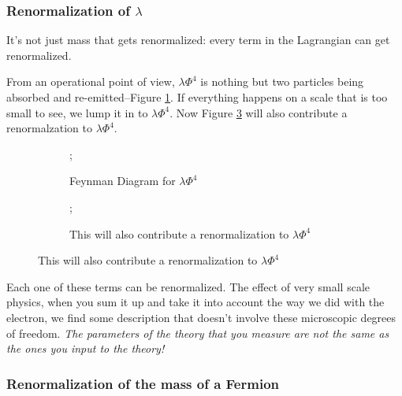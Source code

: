 \documentclass[]{article}
\begin{document}
\subsubsection{Renormalization of $\lambda$}\label{sect:renormalization:lambda}

It's not just mass that gets renormalized: every term in the Lagrangian can get renormalized.

From an operational point of view, $\lambda \Phi^4$ is nothing but two particles being absorbed and re-emitted--Figure \ref{fig:lambda:phi:4}. If everything happens on a scale that is too small to see, we lump it in to $\lambda \Phi^4$. Now Figure \ref{fig:lambda:phi:4x} will also contribute a renormalzation to $\lambda \Phi^4$.

\begin{figure}[H]
	\begin{center}
		\caption{Renormalization of $\lambda \Phi^4$}
		\begin{subfigure}[t]{0.45\textwidth}
			\begin{center}
				\caption{Feynman Diagram for $\lambda \Phi^4$}\label{fig:lambda:phi:4}
				;
			\end{center}
		\end{subfigure}
		\hfill
		\begin{subfigure}[t]{0.45\textwidth}
			\begin{center}
				\caption{This will also contribute a renormalization to $\lambda \Phi^4$}\label{fig:lambda:phi:4x}
				;
			\end{center}
		\end{subfigure}
	\end{center}
\end{figure}

Each one of these terms can be renormalized. The effect of very small scale physics, when you sum it up and take it into account the way we did with the electron, we find some description that doesn't involve these microscopic degrees of freedom. \emph{The parameters of the theory that you measure are not the same as the ones you input to the theory!}

\subsubsection{Renormalization of the mass of a Fermion}
\end{document}
